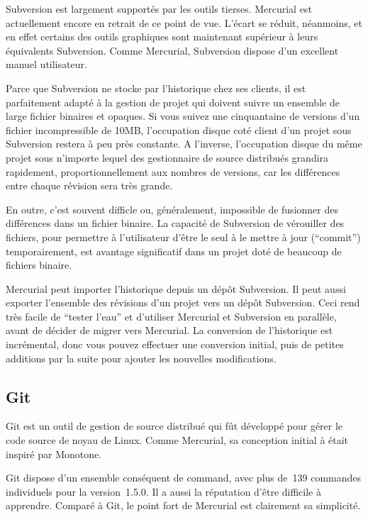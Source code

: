Subversion est largement supportés par les outils tierses. Mercurial est
actuellement encore en retrait de ce point de vue. L'écart se réduit, néanmoins,
et en effet certains des outils graphiques sont maintenant supérieur à leurs
équivalents Subversion. Comme Mercurial, Subversion dispose d'un excellent
manuel utilisateur.

Parce que Subversion ne stocke par l'historique chez ses clients, il est 
parfaitement adapté à la gestion de projet qui doivent suivre un ensemble
de large fichier binaires et opaques. Si vous suivez une cinquantaine de
versions d'un fichier incompressible de 10MB, l'occupation disque coté client
d'un projet sous Subversion restera à peu près constante. A l'inverse, 
l'occupation disque du même projet sous n'importe lequel des gestionnaire
de source distribués grandira rapidement, proportionnellement aux nombres
de versions, car les différences entre chaque révision sera très grande.

En outre, c'est souvent difficle ou, généralement, impossible de fusionner
des différences dans un fichier binaire. La capacité de Subversion de 
vérouiller des fichiers, pour permettre à l'utilisateur d'être le seul
à le mettre à jour (``commit'') temporairement, est avantage significatif
dans un projet doté de beaucoup de fichiers binaire.

Mercurial peut importer l'historique depuis un dépôt Subversion. Il peut
aussi exporter l'ensemble des révisions d'un projet vers un dépôt Subversion.
Ceci rend très facile de ``tester l'eau'' et d'utiliser Mercurial et Subversion
en parallèle, avant de décider de migrer vers Mercurial. La conversion de 
l'historique est incrémental, donc vous pouvez effectuer une conversion 
initial, puis de petites additions par la suite pour ajouter les nouvelles
modifications.

\subsection{Git}

Git est un outil de gestion de source distribué qui fût développé pour gérer
le code source de noyau de Linux. Comme Mercurial, sa conception initial à 
était inspiré par Monotone.

Git dispose d'un ensemble conséquent de command, avec plus de~139 commandes
individuels pour la version~1.5.0. Il a aussi la réputation d'être difficile
à apprendre. Comparé à Git, le point fort de Mercurial est clairement sa 
simplicité.

